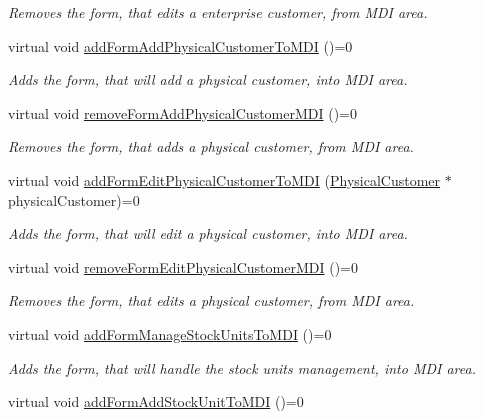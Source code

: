 \begin{DoxyCompactItemize}
\begin{DoxyCompactList}\small\item\em \-Removes the form, that edits a enterprise customer, from \-M\-D\-I area. \end{DoxyCompactList}\item 
virtual void \hyperlink{class_i_main_window_a70e06540b40c2b01aee10854a5209606}{add\-Form\-Add\-Physical\-Customer\-To\-M\-D\-I} ()=0
\begin{DoxyCompactList}\small\item\em \-Adds the form, that will add a physical customer, into \-M\-D\-I area. \end{DoxyCompactList}\item 
virtual void \hyperlink{class_i_main_window_af6ce83fb52514756695479b7b0dfbe53}{remove\-Form\-Add\-Physical\-Customer\-M\-D\-I} ()=0
\begin{DoxyCompactList}\small\item\em \-Removes the form, that adds a physical customer, from \-M\-D\-I area. \end{DoxyCompactList}\item 
virtual void \hyperlink{class_i_main_window_a69a5d1c90da9ee145831417391e86bb2}{add\-Form\-Edit\-Physical\-Customer\-To\-M\-D\-I} (\hyperlink{class_physical_customer}{\-Physical\-Customer} $\ast$physical\-Customer)=0
\begin{DoxyCompactList}\small\item\em \-Adds the form, that will edit a physical customer, into \-M\-D\-I area. \end{DoxyCompactList}\item 
virtual void \hyperlink{class_i_main_window_a5a6911f27447a926305af2f4abc797de}{remove\-Form\-Edit\-Physical\-Customer\-M\-D\-I} ()=0
\begin{DoxyCompactList}\small\item\em \-Removes the form, that edits a physical customer, from \-M\-D\-I area. \end{DoxyCompactList}\item 
virtual void \hyperlink{class_i_main_window_aa5acb550059d9e11f4aeae436653834d}{add\-Form\-Manage\-Stock\-Units\-To\-M\-D\-I} ()=0
\begin{DoxyCompactList}\small\item\em \-Adds the form, that will handle the stock units management, into \-M\-D\-I area. \end{DoxyCompactList}\item 
virtual void \hyperlink{class_i_main_window_a9e0af2acbef270d8bf914cfd6c21b48e}{add\-Form\-Add\-Stock\-Unit\-To\-M\-D\-I} ()=0

\end{DoxyCompactItemize}
